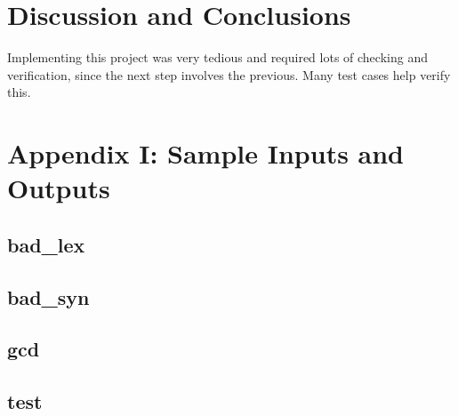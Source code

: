 \documentclass[titlepage]{article}
\begin{document}
\section*{Discussion and Conclusions}
Implementing this project was very tedious and required
lots of checking and verification, since the
next step involves the previous. Many test cases
help verify this.



\clearpage{}
\section*{Appendix I: Sample Inputs and Outputs}
\lstset{language=Pascal}

\subsection*{bad\_lex}




\clearpage{}
\subsection*{bad\_syn}




\clearpage{}
\subsection*{gcd}




\clearpage{}
\subsection*{test}




\clearpage{}
\end{document}
